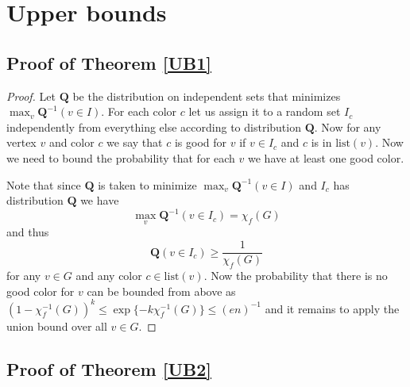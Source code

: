 \documentclass[12pt]{article}
\theoremstyle{remark}
\theoremstyle{definition}
\newcommand{\mQ}{\mathbf{Q}}
\newcommand{\lst}{\mathrm{list}}
\begin{document}
\section{Upper bounds}

\subsection{Proof of Theorem \ref{UB1}}

\begin{proof}
    Let $\mathbf{Q}$ be the distribution on independent sets that minimizes $\max_{v} \mQ^{-1}(v \in I)$. For each color $c$ let us assign it to a random set $I_c$ independently from everything else according to distribution $\mQ$. Now for any vertex $v$ and color $c$ we say that $c$ is good for $v$ if $v \in I_c$ and $c$ is in $\lst(v)$. Now we need to bound the probability that for each $v$ we have at least one good color. 
    
    Note that since $\mQ$ is taken to minimize $\max_{v} \mQ^{-1}(v \in I)$ and $I_c$ has distribution $\mQ$ we have $$\max_{v} \mQ^{-1}(v \in I_c) = \chi_f(G)$$ and thus
    $$
        \mQ(v \in I_c) \geq \frac{1}{\chi_f(G)}
    $$
    for any $v \in G$ and any color $c \in \lst(v)$. Now the probability that there is no good color for $v$ can be bounded from above as $(1 - \chi_f^{-1}(G))^{k} \leq \exp\{-k\chi_f^{-1}(G)\} \leq (en)^{-1}$ and it remains to apply the union bound over all $v \in G$.
\end{proof}

\subsection{Proof of Theorem \ref{UB2}}
\end{document}
